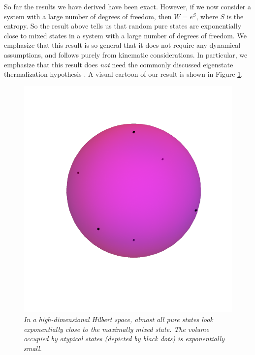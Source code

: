 \documentclass[12pt]{article}
\begin{document}
So far the results we have derived have been exact. However, if we now consider a system with a large number of degrees of freedom, then $W = e^{S}$, where $S$ is the entropy. So the result above tells us that random pure states are exponentially close to mixed states in a system with a large number of degrees of freedom. We emphasize that this result is so general that it does not require any dynamical assumptions, and follows purely from kinematic considerations. In particular, we emphasize that this result does {\em not} need the commonly discussed eigenstate thermalization hypothesis \cite{Deutsch,srednicki1994chaos,srednicki1999approach}. A visual cartoon of our result is shown in Figure \ref{genericspace}.
\begin{figure}[!ht]
\begin{center}
\includegraphics[height=0.5\textheight]{genericstates.pdf}
\caption{\em In a high-dimensional Hilbert space, almost all pure states look exponentially close to the maximally mixed state. The volume occupied by atypical states (depicted by black dots) is exponentially small. \label{genericspace}}
\end{center}
\end{figure}
\end{document}
